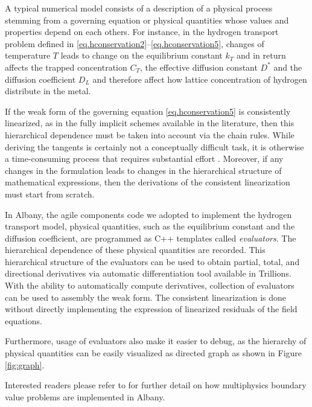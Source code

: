 \documentclass[10pt]{elsarticle}
\begin{document}
 A typical numerical model consists of a description of a physical process
stemming from a governing equation or physical quantities whose values 
and properties depend on each others. For instance, in the hydrogen
transport problem defined in \eqref{eq.hconservation2}--\eqref{eq.hconservation5},
changes of temperature $T$ leads to change on the equilibrium constant $k_{T}$
and in return affects the trapped concentration $C_{T}$, the effective diffusion
constant $D^{*}$ and the diffusion coefficient $D_{L}$ and therefore affect how 
lattice concentration of hydrogen distribute in the metal. 

If the weak form of the governing equation \eqref{eq.hconservation5} is 
consistently linearized, as in the fully implicit schemes available 
in the literature, then this 
hierarchical dependence must be taken into account via the chain rules. 
While deriving the tangents is certainly not a conceptually difficult task, 
it is otherwise a time-consuming process that requires 
substantial effort . Moreover, if any changes in the formulation leads to changes in 
the hierarchical structure of mathematical expressions, then the derivations of the consistent linearization must
start from scratch. 

In Albany, the agile components code we adopted to implement the hydrogen
transport model,  physical quantities, such as the equilibrium constant and the
diffusion coefficient, are programmed as C++ templates called \emph{evaluators}.
The hierarchical dependence of these physical quantities are recorded. 
This hierarchical structure of the evaluators can be used to obtain partial, total,
and directional derivatives via automatic differentiation tool available in 
Trillions. With the ability to automatically compute derivatives, collection of 
evaluators can be used to assembly the weak form. The consistent linearization
is done without directly implementing the expression of linearized
residuals of the field equations. 

Furthermore, usage of evaluators also make it
easier to debug, as the hierarchy of physical quantities can be easily visualized
as directed graph as shown in Figure \ref{fig:graph}. 
\begin{figure}[h!]
\end{figure}
Interested readers please refer to \citep{Salinger:2010, Pawlowski:2012a, Pawlowski:2012b, Salinger:2013, Sun:2013}
for further detail on how multiphysics boundary value problems
are implemented in Albany. 
 
\end{document}

